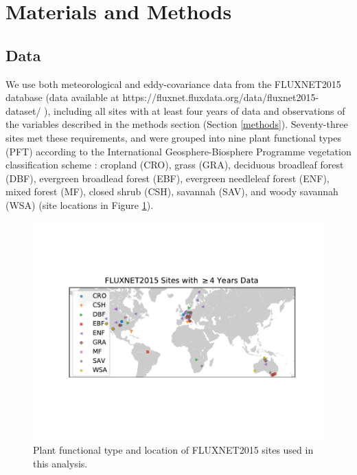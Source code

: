 \documentclass[draft,linenumbers]{agujournal}
\begin{document}
\section{Materials and Methods}
\subsection{Data}
\label{data}
We use both meteorological and eddy-covariance data from the FLUXNET2015 database (data available at \sloppy https://fluxnet.fluxdata.org/data/fluxnet2015-dataset/ \sloppy), including all sites with at least four years of data and observations of the variables described in the methods section (Section \ref{methods}). Seventy-three sites met these requirements, and were grouped into nine plant functional types (PFT) according to the International Geosphere-Biosphere Programme vegetation classification scheme \citep{Loveland_1999}: cropland (CRO), grass (GRA), deciduous broadleaf forest (DBF), evergreen broadlead forest (EBF), evergreen needleleaf forest (ENF), mixed forest (MF), closed shrub (CSH), savannah (SAV), and woody savannah (WSA) (site locations in Figure \ref{map_fig}).

\begin{figure}
\centering
\includegraphics[width=\textwidth]{./map.pdf}
\caption{Plant functional type and location of FLUXNET2015 sites used in this analysis.}
\label{map_fig}
 \end{figure}
\end{document}
